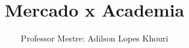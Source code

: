 \documentclass[compress, hyperref={pdfpagelayout=SinglePage}]{beamer}
\title[TCC II - Aula 02]{Mercado x Academia}
\author{Professor Mestre: Adilson Lopes Khouri}
\begin{document}
	\begin{frame}
		\titlepage
	\end{frame}
	
	
	
	
	
	
	
	
	
	
					
	

	
\end{document}
